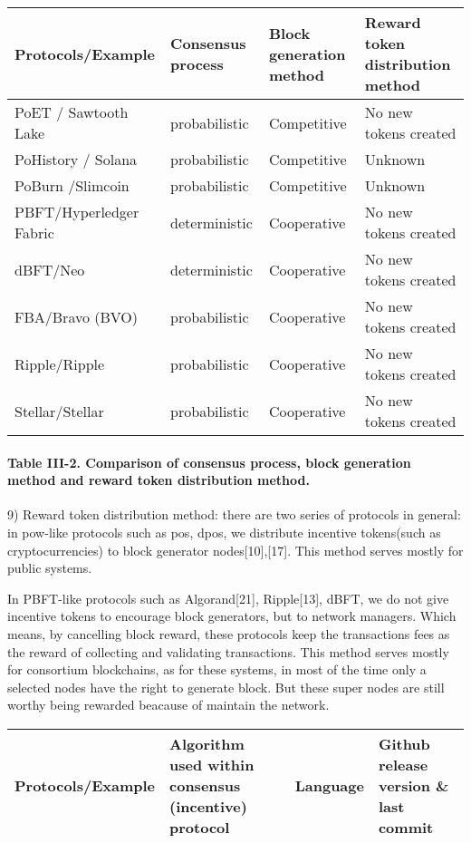 \documentclass[doublespacing]{bmcart}
\begin{document}
\begin{CJK*}{UTF8}{gbsn}
\begin{tabular}{p{2cm}p{3cm}p{3cm}p{3cm}}
\hline
Protocols/E\-xample  & Consensus process & Block generation method & Reward token distribution method \\ \hline
PoET / Sawtooth Lake & probabilistic & Competitive & No new tokens created \\ \hline

PoHistory / Solana & probabilistic & Competitive & Unknown \\ \hline
PoBurn /\newline Slimcoin & probabilistic & Competitive &  Unknown  \\ \hline
PBFT/Hyp\-erledger Fabric & deterministic & Cooperative & No new tokens created  \\ \hline
dBFT/Neo & deterministic & Cooperative & No new tokens created   \\ \hline
FBA/Bravo (BVO) & probabilistic & Cooperative & No new tokens created  \\ \hline
Ripple/Ripple & probabilistic & Cooperative & No new tokens created  \\ \hline
Stellar/Stellar & probabilistic & Cooperative & No new tokens created   \\ \hline
\end{tabular}
\paragraph{Table III-2. Comparison of consensus process, block generation method and reward token distribution method.}


9) Reward token distribution method: there are two series of protocols in general: in pow-like protocols such as pos, dpos, we distribute incentive tokens(such as cryptocurrencies) to block generator nodes[10],[17]. This method serves mostly for public systems. 

In PBFT-like protocols such as Algorand[21], Ripple[13], dBFT, we do not give incentive tokens to encourage block generators, but to network managers. Which means, by cancelling block reward, these protocols keep the transactions fees as the reward of collecting and validating transactions. This method serves mostly for consortium blockchains, as for these systems, in most of the time only a selected nodes have the right to generate block. But these super nodes are still worthy being rewarded beacause of maintain the network.

\begin{tabular}{p{2cm}p{3cm}p{3cm}p{3cm}}
\hline
Protocols/E\-xample 
& Algorithm used within consensus (incentive) protocol 
& Language 
& Github release version \& last commit \\ \hline


\end{tabular}
\end{CJK*}
\end{document}
